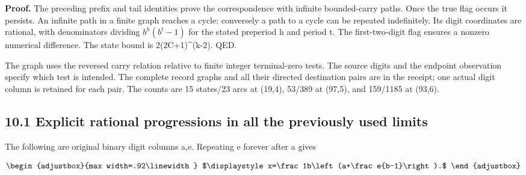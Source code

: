 \textbf{Proof.} The preceding prefix and tail identities prove the correspondence with infinite bounded-carry paths. Once the true flag occurs it persists. An infinite path in a finite graph reaches a cycle; conversely a path to a cycle can be repeated indefinitely. Its digit coordinates are rational, with denominators dividing \(b^h(b^t-1)\) for the stated preperiod h and period t. The first-two-digit flag ensures a nonzero numerical difference. The state bound is 2(2C+1)\^{}(k-2). QED.

The graph uses the reversed carry relation relative to finite integer terminal-zero tests. The source digits and the endpoint observation specify which test is intended. The complete record graphs and all their directed destination pairs are in the receipt; one actual digit column is retained for each pair. The counts are 15 states/23 arcs at (19,4), 53/389 at (97,5), and 159/1185 at (93,6).

\subsection{10.1 Explicit rational progressions in all the previously used limits}\label{n20-explicit-rational-progressions-in-all-the-previously-used-limits}

The following are original binary digit columns a,e. Repeating e forever after a gives

\[
\begin{adjustbox}{max width=.92\linewidth}
$\displaystyle x=\frac1b\left(a+\frac e{b-1}\right).$
\end{adjustbox}
\]

